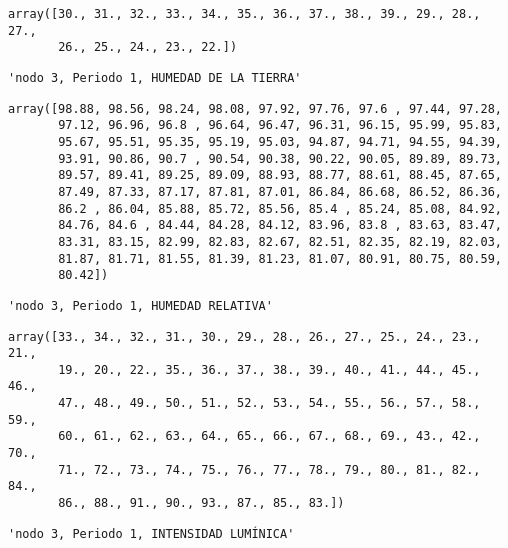 \documentclass[11pt]{article}
\begin{document}
    \begin{verbatim}
array([30., 31., 32., 33., 34., 35., 36., 37., 38., 39., 29., 28., 27.,
       26., 25., 24., 23., 22.])
    \end{verbatim}

    
    
    \begin{verbatim}
'nodo 3, Periodo 1, HUMEDAD DE LA TIERRA'
    \end{verbatim}

    
    
    \begin{verbatim}
array([98.88, 98.56, 98.24, 98.08, 97.92, 97.76, 97.6 , 97.44, 97.28,
       97.12, 96.96, 96.8 , 96.64, 96.47, 96.31, 96.15, 95.99, 95.83,
       95.67, 95.51, 95.35, 95.19, 95.03, 94.87, 94.71, 94.55, 94.39,
       93.91, 90.86, 90.7 , 90.54, 90.38, 90.22, 90.05, 89.89, 89.73,
       89.57, 89.41, 89.25, 89.09, 88.93, 88.77, 88.61, 88.45, 87.65,
       87.49, 87.33, 87.17, 87.81, 87.01, 86.84, 86.68, 86.52, 86.36,
       86.2 , 86.04, 85.88, 85.72, 85.56, 85.4 , 85.24, 85.08, 84.92,
       84.76, 84.6 , 84.44, 84.28, 84.12, 83.96, 83.8 , 83.63, 83.47,
       83.31, 83.15, 82.99, 82.83, 82.67, 82.51, 82.35, 82.19, 82.03,
       81.87, 81.71, 81.55, 81.39, 81.23, 81.07, 80.91, 80.75, 80.59,
       80.42])
    \end{verbatim}

    
    
    \begin{verbatim}
'nodo 3, Periodo 1, HUMEDAD RELATIVA'
    \end{verbatim}

    
    
    \begin{verbatim}
array([33., 34., 32., 31., 30., 29., 28., 26., 27., 25., 24., 23., 21.,
       19., 20., 22., 35., 36., 37., 38., 39., 40., 41., 44., 45., 46.,
       47., 48., 49., 50., 51., 52., 53., 54., 55., 56., 57., 58., 59.,
       60., 61., 62., 63., 64., 65., 66., 67., 68., 69., 43., 42., 70.,
       71., 72., 73., 74., 75., 76., 77., 78., 79., 80., 81., 82., 84.,
       86., 88., 91., 90., 93., 87., 85., 83.])
    \end{verbatim}

    
    
    \begin{verbatim}
'nodo 3, Periodo 1, INTENSIDAD LUMÍNICA'
    \end{verbatim}

    
    
\end{document}
